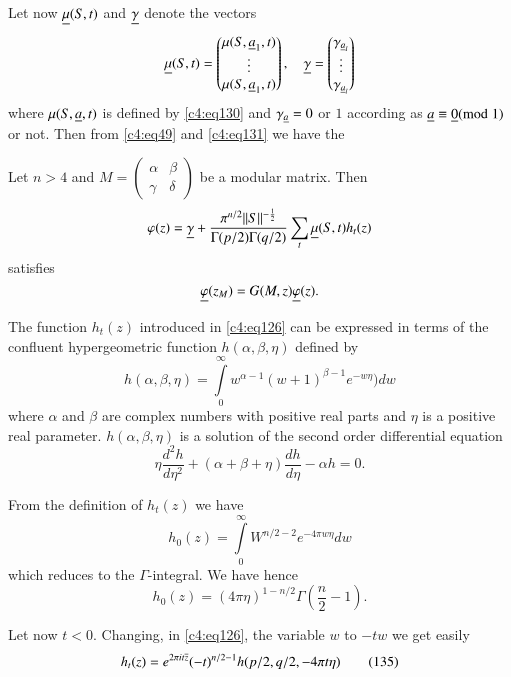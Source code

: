 Let now $\underline{\mu}(S,t)$ and $\underline{\gamma}$ denote the vectors 
$$
\underline{\mu}(S,t)=
\begin{pmatrix}
\mu(S,\underline{a}_{1},t)\\
\vdots\\
\mu(S,\underline{a}_{1},t)
\end{pmatrix},\quad 
\underline{\gamma}=
\begin{pmatrix}
\gamma_{\underline{a}_{l}}\\
\vdots\\
\gamma_{\underline{a}_{l}}
\end{pmatrix}
$$\pageoriginale
where $\mu(S,\underline{a},t)$ is defined by \eqref{c4:eq130} and
$\gamma_{\underline{a}}=0$ or $1$ according as $\underline{a}\equiv \underline{0}(\rm{mod} \; 1)$
or not. Then from \eqref{c4:eq49} and \eqref{c4:eq131} we have the 

\begin{thm}\label{chap4:thm9}
Let $n>4$ and $M=\left(\begin{smallmatrix} \alpha & \beta\\ \gamma &
  \delta
\end{smallmatrix}\right)$ be a modular matrix. Then
$$
\varphi(z)=\underline{\gamma}+\frac{\pi^{n/2}||S||^{-\frac{1}{2}}}{\Gamma(p/2)\Gamma(q/2)}\sum_{t}\underline{\mu}(S,t)h_{t}(z) 
$$
satisfies
$$
\underline{\varphi}(z_{M})=G(M,z)\underline{\varphi}(z).
$$
\end{thm}

The function $h_{t}(z)$ introduced in \eqref{c4:eq126} can be expressed in
terms of the confluent hypergeometric function $h(\alpha,\beta,\eta)$
defined by
$$
h(\alpha,\beta,\eta)=\int\limits^{\infty}_{0}
w^{\alpha-1}(w+1)^{\beta-1} e^{-w\eta})dw 
$$
where $\alpha$ and $\beta$ are complex numbers with positive real
parts and $\eta$ is a positive real parameter. $h(\alpha,\beta,\eta)$
is a solution of the second order differential equation
$$
\eta
\frac{d^{2}h}{d\eta^{2}}+(\alpha+\beta+\eta)\frac{dh}{d\eta}-\alpha
h =0.
$$

From the definition of $h_{t}(z)$ we have
$$
h_{0}(z)=\int\limits^{\infty}_{0}W^{n/2-2}e^{-4\pi w\eta}dw
$$
which reduces to the $\Gamma$-integral. We have hence 
\begin{equation*}
h_{0}(z)=(4\pi
\eta)^{1-n/2}\Gamma\left(\frac{n}{2}-1\right).\tag{134}\label{c4:eq134} 
\end{equation*}

Let now $t<0$. Changing, in \eqref{c4:eq126}, the variable $w$ to $-tw$ we
get easily 
\begin{equation*}
h_{t}(z)=e^{2\pi it\overline{z}}(-t)^{n/2-1}h(p/2,q/2,-4\pi t\eta)\tag{135}\label{c4:eq135}
\end{equation*}\pageoriginale

